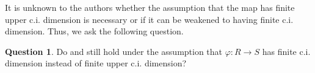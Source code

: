 \documentclass{amsart}
\theoremstyle{definition}
\newtheorem{question}[theorem]{Question}
\begin{document}
It is unknown to the authors whether the assumption that the map has finite upper c.i. dimension is necessary or if it can be weakened to having finite c.i. dimension. Thus, we ask the following question.

\begin{question}
    Do  and  still hold under the assumption that $\varphi \colon R \to S$ has finite c.i. dimension instead of finite upper c.i. dimension?
\end{question}































\end{document}
